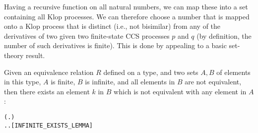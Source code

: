 Having
 a recursive function  on all natural numbers,
  we can map these into a set containing  all Klop processes. 
We can therefore 
choose a number that is mapped onto a Klop process
that is distinct (i.e., not bisimilar)  from 
any  of the derivatives of two  given 
two finite-state CCS processes $p$ and $q$
(by definition, the number of such derivatives is finite).
This is done by 
appealing to a basic set-theory result.

\begin{lemma}
Given an equivalence relation $R$ defined on a type, and two sets $A, B$
of elements in this type, $A$ is finite, $B$ is infinite, and all elements
in $B$ are not equivalent, then there exists an element $k$ in $B$
which is not equivalent with any element in $A$:
\begin{alltt}
\HOLTokenTurnstile{}   \HOLSymConst{\HOLTokenImp{}}
     \HOLSymConst{\HOLTokenConj{}}   \HOLSymConst{\HOLTokenConj{}}
   (\HOLSymConst{\HOLTokenForall{}} .  \HOLSymConst{\HOLTokenIn{}}  \HOLSymConst{\HOLTokenConj{}}  \HOLSymConst{\HOLTokenIn{}}  \HOLSymConst{\HOLTokenConj{}}  \HOLSymConst{\HOLTokenNotEqual{}}  \HOLSymConst{\HOLTokenImp{}} \HOLSymConst{\HOLTokenNeg{}}  ) \HOLSymConst{\HOLTokenImp{}}
   \HOLSymConst{\HOLTokenExists{}}.  \HOLSymConst{\HOLTokenIn{}}  \HOLSymConst{\HOLTokenConj{}} \HOLSymConst{\HOLTokenForall{}}.  \HOLSymConst{\HOLTokenIn{}}  \HOLSymConst{\HOLTokenImp{}} \HOLSymConst{\HOLTokenNeg{}}  \hfill[INFINITE_EXISTS_LEMMA]
\end{alltt}
\end{lemma}

